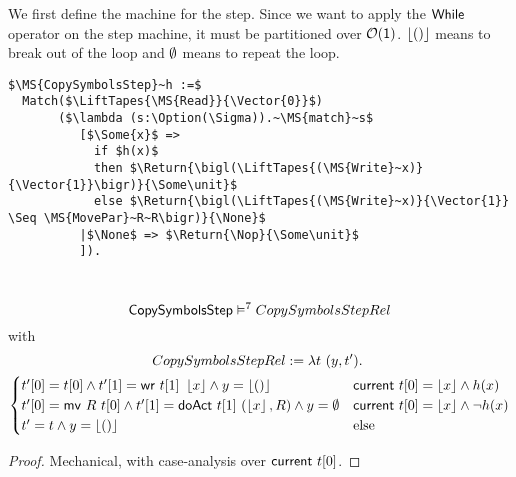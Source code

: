 We first define the machine for the step.  Since we want to apply the $\mathsf{While}$ operator on the step machine, it must be partitioned over
$\mathcal{O}(\mathsf{1})$.  $\left\lfloor {\ensuremath{\mathsf{()}}} \right\rfloor$ means to break out of the loop and $\emptyset$ means to repeat the loop.
\begin{definition}[$\MS{CopySymbolsStep}$]
  \label{CopySymbols_Step}
\begin{lstlisting}[style=semicoqstyle]
$\MS{CopySymbolsStep}~h :=$
  Match($\LiftTapes{\MS{Read}}{\Vector{0}}$)
       ($\lambda (s:\Option(\Sigma)).~\MS{match}~s$
          [$\Some{x}$ =>
            if $h(x)$
            then $\Return{\bigl(\LiftTapes{(\MS{Write}~x)}{\Vector{1}}\bigr)}{\Some\unit}$ 
            else $\Return{\bigl(\LiftTapes{(\MS{Write}~x)}{\Vector{1}} \Seq \MS{MovePar}~R~R\bigr)}{\None}$ 
          |$\None$ => $\Return{\Nop}{\Some\unit}$ 
          ]).
\end{lstlisting}
\end{definition}

\begin{lemma}
  \label{lem:CopySymbols_Step_Sem}
  ~
  \[
    \mathsf{CopySymbolsStep} \mathrel{\vDash^{7}} CopySymbolsStepRel
  \]
  with
  \small
  \begin{multline*}
    CopySymbolsStepRel := \lambda t~(y, t').~\\
    \begin{cases}
      t'[0] = t[0]           \land t'[1]=\mathsf{wr}~t[1]~\left\lfloor {x} \right\rfloor         \land y=\left\lfloor {\ensuremath{\mathsf{()}}} \right\rfloor & \mathsf{current}~t[0]=\left\lfloor {x} \right\rfloor \land       h(x) \\
      t'[0] = \mathsf{mv}~R~t[0] \land t'[1]=\mathsf{doAct}~t[1]~(\left\lfloor {x} \right\rfloor, R) \land y=\emptyset      & \mathsf{current}~t[0]=\left\lfloor {x} \right\rfloor \land \lnot h(x) \\
      t' = t \land y=\left\lfloor {\ensuremath{\mathsf{()}}} \right\rfloor                                                           & \text{else}
    \end{cases}
  \end{multline*}
\end{lemma}
\begin{proof}
  Mechanical, with case-analysis over $\mathsf{current}~t[0]$.
\end{proof}


